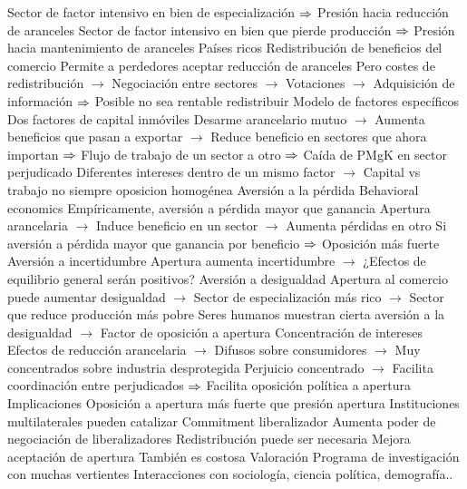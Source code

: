 \documentclass{nuevotema}
\begin{document}
\begin{esquemal}
				\4[] Sector de factor intensivo en bien de especialización
				\4[] $\Rightarrow$ Presión hacia reducción de aranceles
				\4[] Sector de factor intensivo en bien que pierde producción
				\4[] $\Rightarrow$ Presión hacia mantenimiento de aranceles
				\4[] Países ricos
				\4 Redistribución de beneficios del comercio
				\4[] Permite a perdedores aceptar reducción de aranceles
				\4[] Pero costes de redistribución
				\4[] $\to$ Negociación entre sectores
				\4[] $\to$ Votaciones
				\4[] $\to$ Adquisición de información
				\4[] $\Rightarrow$ Posible no sea rentable redistribuir
				\4 Modelo de factores específicos
				\4[] Dos factores de capital inmóviles
				\4[] Desarme arancelario mutuo
				\4[] $\to$ Aumenta beneficios que pasan a exportar
				\4[] $\to$ Reduce beneficio en sectores que ahora importan
				\4[] $\Rightarrow$ Flujo de trabajo de un sector a otro
				\4[] $\Rightarrow$ Caída de PMgK en sector perjudicado
				\4[] Diferentes intereses dentro de un mismo factor
				\4[] $\to$ Capital vs trabajo no siempre oposicion homogénea
				\4 Aversión a la pérdida
				\4[] Behavioral economics
				\4[] Empíricamente, aversión a pérdida mayor que ganancia
				\4[] Apertura arancelaria
				\4[] $\to$ Induce beneficio en un sector
				\4[] $\to$ Aumenta pérdidas en otro
				\4[] Si aversión a pérdida mayor que ganancia por beneficio
				\4[] $\Rightarrow$ Oposición más fuerte
				\4 Aversión a incertidumbre
				\4[] Apertura aumenta incertidumbre
				\4[] $\to$ ¿Efectos de equilibrio general serán positivos?
				\4 Aversión a desigualdad
				\4[] Apertura al comercio puede aumentar desigualdad
				\4[] $\to$ Sector de especialización más rico
				\4[] $\to$ Sector que reduce producción más pobre
				\4[] Seres humanos muestran cierta aversión a la desigualdad
				\4[] $\to$ Factor de oposición a apertura
				\4 Concentración de intereses
				\4[] Efectos de reducción arancelaria
				\4[] $\to$ Difusos sobre consumidores
				\4[] $\to$ Muy concentrados sobre industria desprotegida
				\4[] Perjuicio concentrado
				\4[] $\to$ Facilita coordinación entre perjudicados
				\4[] $\Rightarrow$ Facilita oposición política a apertura
			\3 Implicaciones
				\4 Oposición a apertura más fuerte que presión apertura
				\4 Instituciones multilaterales pueden catalizar
				\4[] Commitment liberalizador
				\4[] Aumenta poder de negociación de liberalizadores
				\4 Redistribución puede ser necesaria
				\4[] Mejora aceptación de apertura
				\4[] También es costosa
			\3 Valoración
				\4 Programa de investigación con muchas vertientes
				\4 Interacciones con sociología, ciencia política, demografía..

\end{esquemal}
\end{document}
